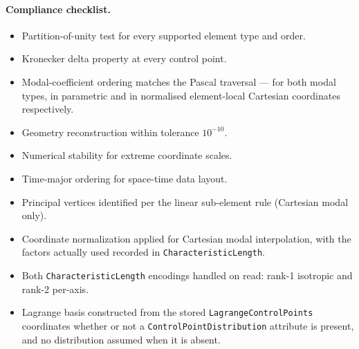 \documentclass[11pt,letterpaper]{article}
\newif\ifvfourdraft
\newcommand{\vfour}[1]{\ifvfourdraft\textcolor{v4violet}{#1}\else#1\fi}
\begin{document}
\paragraph{Compliance checklist.}
\begin{itemize}
  \item Partition-of-unity test for every supported element type and order.
  \item Kronecker delta property at every control point.
  \item \vfour{Modal-coefficient ordering matches the Pascal traversal --- for
    both modal types, in parametric and in normalised element-local Cartesian
    coordinates respectively.}
  \item Geometry reconstruction within tolerance $10^{-10}$.
  \item Numerical stability for extreme coordinate scales.
  \item Time-major ordering for space-time data layout.
  \item Principal vertices identified per the linear sub-element rule (Cartesian modal only).
  \item Coordinate normalization applied for Cartesian modal interpolation, with the
    factors actually used recorded in
    \texttt{Charac\-teristic\-Length}.
  \item Both \texttt{Charac\-teristic\-Length} encodings handled on read: rank-1
    isotropic and rank-2 per-axis.
  \item Lagrange basis constructed from the stored \texttt{LagrangeControlPoints}
    coordinates whether or not a \texttt{ControlPointDistribution} attribute
    is present, and no distribution assumed when it is absent.
\end{itemize}
\end{document}
